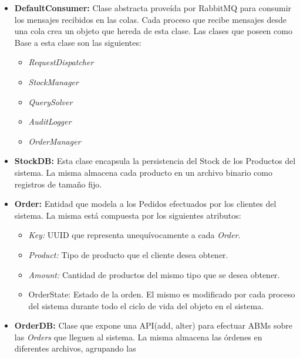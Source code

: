 \documentclass[a4paper,10pt]{article}
\begin{document}
        \begin{itemize}
            \item \textbf{DefaultConsumer:} Clase abstracta proveída por 
            RabbitMQ para consumir los mensajes recibidos en las colas. Cada 
            proceso que recibe mensajes desde una cola crea un objeto que 
            hereda de esta clase. Las clases que poseen como Base a esta clase
            son las siguientes:
            \begin{itemize}
                \item \textit{RequestDispatcher}
                \item \textit{StockManager}
                \item \textit{QuerySolver}
                \item \textit{AuditLogger}
                \item \textit{OrderManager}
            \end{itemize}
            \item \textbf{StockDB:} Esta clase encapsula la persistencia del 
            Stock de los Productos del sistema. La misma almacena cada 
            producto en un archivo binario como registros de tamaño fijo. 
            \item \textbf{Order:} Entidad que modela a los Pedidos efectuados
            por los clientes del sistema. La misma está compuesta por los 
            siguientes atributos:
                \begin{itemize}
                    \item \textit{Key:} UUID que representa unequívocamente a 
                    cada \textit{Order}. 
                    \item \textit{Product:} Tipo de producto que el cliente
                    desea obtener.
                    \item \textit{Amount:} Cantidad de productos del mismo
                    tipo que se desea obtener.
                    \item{OrderState:} Estado de la orden. El mismo es 
                    modificado por cada proceso del sistema durante todo el 
                    ciclo de vida del objeto en el sistema.
                \end{itemize}
            \item \textbf{OrderDB:} Clase que expone una API(add, alter) para 
            efectuar ABMs sobre las \textit{Orders} que lleguen al sistema. La
            misma almacena las órdenes en diferentes archivos, agrupando las 

\end{itemize}
\end{document}
